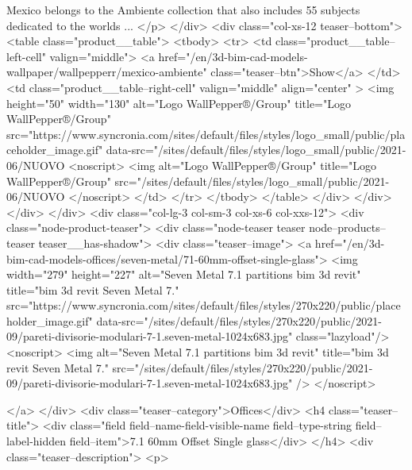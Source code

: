             Mexico belongs to the Ambiente collection that also includes 55 subjects dedicated to the worlds ...
	</p>
	</div>
	<div class="col-xs-12 teaser--bottom">
		<table class="product__table">
            <tbody>
            	<tr>
                	<td class="product__table--left-cell" valign="middle"> 
                    	<a href="/en/3d-bim-cad-models-wallpaper/wallpepperr/mexico-ambiente" class="teaser--btn">Show</a>
                	</td>
               		<td class="product__table--right-cell" valign="middle" align="center" >
                    	<img  height="50" width="130" alt="Logo WallPepper®/Group" title="Logo WallPepper®/Group" src="https://www.syncronia.com/sites/default/files/styles/logo_small/public/placeholder_image.gif" data-src="/sites/default/files/styles/logo_small/public/2021-06/NUOVO%
            <noscript>
                <img alt="Logo WallPepper®/Group" title="Logo WallPepper®/Group" src="/sites/default/files/styles/logo_small/public/2021-06/NUOVO%
            </noscript>
					</td>
           		</tr>
            </tbody>
        </table>
	</div>
</div>
          </div>
      </div>
            <div  class="col-lg-3 col-sm-3 col-xs-6 col-xxs-12">
          <div class="node-product-teaser">
          <div class="node-teaser teaser node--products--teaser teaser__has-shadow">
	<div class="teaser--image">
		<a href="/en/3d-bim-cad-models-offices/seven-metal/71-60mm-offset-single-glass">
			<img width="279" height="227" alt="Seven Metal 7.1 partitions bim 3d revit" title="bim 3d revit Seven Metal 7." src="https://www.syncronia.com/sites/default/files/styles/270x220/public/placeholder_image.gif" data-src="/sites/default/files/styles/270x220/public/2021-09/pareti-divisorie-modulari-7-1.seven-metal-1024x683.jpg" class="lazyload"/>
            <noscript>
                <img alt="Seven Metal 7.1 partitions bim 3d revit" title="bim 3d revit Seven Metal 7." src="/sites/default/files/styles/270x220/public/2021-09/pareti-divisorie-modulari-7-1.seven-metal-1024x683.jpg" />
            </noscript>
			
		</a> 
	</div>
	<div class="teaser--category">Offices</div>
	<h4 class="teaser--title">
            <div class="field field--name-field-visible-name field--type-string field--label-hidden field--item">7.1 60mm Offset Single glass</div>
      </h4>
	<div  class="teaser--description">
	<p>
				
